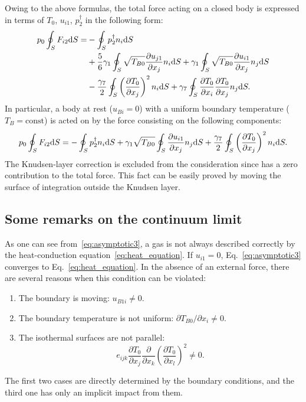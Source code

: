 \documentclass[smallextended, final]{svjour3} %
\newcommand{\dd}{\mathrm{d}}
\newcommand{\pder}[2][]{\frac{\partial#1}{\partial#2}}
\newcommand{\Pder}[2][]{\partial#1/\partial#2}
\begin{document}
Owing to the above formulas, the total force acting on a closed body
is expressed in terms of \(T_0\), \(u_{i1}\), \(p^\dag_2\) in the following form:
\begin{align}\label{eq:force:terms_general}
    p_0 \oint_S F_{i2} \dd{S} =
        &- \oint_S p_2^\dag n_i \dd{S} \notag\\
        &+ \frac{5}{6}\gamma_1 \oint_S \sqrt{T_{B0}} \pder[u_{j1}]{x_j} n_i \dd{S}
        + \gamma_1 \oint_S \sqrt{T_{B0}} \pder[u_{i1}]{x_j} n_j \dd{S} \notag\\
        &- \frac{\gamma_7}{2} \oint_S \left(\pder[T_0]{x_j}\right)^2 n_i \dd{S}
        + \gamma_7 \oint_S \pder[T_0]{x_i}\pder[T_0]{x_j} n_j \dd{S}.
\end{align}
In particular, a body at rest (\(u_{Bi} =0 \)) with a uniform boundary temperature (\(T_B = \mathrm{const}\))
is acted on by the force consisting on the following components:
\begin{equation}\label{eq:force:terms}
    p_0 \oint_S F_{i2} \dd{S} =
        - \oint_S p_2^\dag n_i \dd{S} \\
        + \gamma_1 \sqrt{T_{B0}} \oint_S \pder[u_{i1}]{x_j} n_j \dd{S}
        + \frac{\gamma_7}{2} \oint_S \left(\pder[T_0]{x_j}\right)^2 n_i \dd{S}.
\end{equation}
The Knudsen-layer correction is excluded from the consideration since has a zero contribution to the total force.
This fact can be easily proved by moving the surface of integration outside the Knudsen layer.

\subsection{Some remarks on the continuum limit}

As one can see from~\eqref{eq:asymptotic3}, a gas is not always described correctly
by the heat-conduction equation~\eqref{eq:heat_equation}.
If \(u_{i1} = 0\), Eq.~\eqref{eq:asymptotic3} converges to Eq.~\eqref{eq:heat_equation}.
In the absence of an external force, there are several reasons when this condition can be violated:
\begin{enumerate}
    \item The boundary is moving: \(u_{B1i} \neq 0 \).
    \item The boundary temperature is not uniform: \(\Pder[T_{B0}]{x_i} \neq 0 \).
    \item The isothermal surfaces are not parallel:
        \begin{equation}\label{eq:equilibrium}
            e_{ijk}\pder[T_0]{x_j}\pder{x_k}\left(\pder[T_0]{x_l}\right)^2 \neq 0.
        \end{equation}
\end{enumerate}
The first two cases are directly determined by the boundary conditions,
and the third one has only an implicit impact from them.
\end{document}
